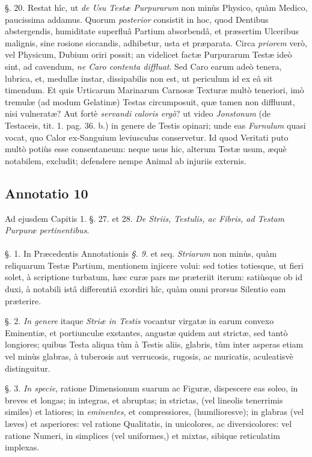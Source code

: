 \documentclass[a4paper, 11pt, oneside, polutonikogreek, german]{article}
\begin{document}
§. 20. Restat hîc, ut \emph{de Usu Testæ Purpurarum} non minùs Physico, quàm Medico, paucissima addamus. Quorum \emph{posterior} consistit in hoc, quod Dentibus abstergendis, humiditate superfluâ Partium absorbendâ, et præsertim Ulceribus malignis, sine rosione siccandis, adhibetur, usta et præparata. Circa \emph{priorem} verò, vel Physicum, Dubium oriri possit; an videlicet factæ Purpurarum Testæ ideò sint, ad cavendum, \emph{ne Caro contenta diffluat}. Sed Caro earum adeò tenera, lubrica, et, medullæ instar, dissipabilis non est, ut periculum id ex eâ sit timendum. Et quis Urticarum Marinarum Carnosæ Texturæ multò teneriori, imò tremulæ (ad modum Gelatinæ) Testas circumposuit, quæ tamen non diffluunt, nisi vulneratæ? Aut fortè \emph{servandi caloris ergò}? ut video \emph{Jonstonum} (de Testaceis, tit. 1. pag. 36. b.) in genere de Testis opinari; unde eas \emph{Furnulum} quasi vocat, quo Calor ex-Sanguium leviusculus conservetur. Id quod Veritati puto multò potiùs esse consentaneum: neque usus hic, alterum Testæ usum, æquè notabilem, excludit; defendere nempe Animal ab injuriis externis.

\subsection{Annotatio 10}
\begin{center}
Ad ejusdem Capitis 1. §. 27. et 28. \emph{De Striis, Testulis, ac Fibris, ad Testam Purpuræ pertinentibus}.
\end{center}
\paragraph{}
§. 1. In Præcedentis Annotationis \emph{§. 9.} et seq. \emph{Striarum} non minùs, quàm reliquarum Testæ Partium, mentionem injicere volui: sed toties totiesque, ut fieri solet, à scriptione turbatum, hæc curæ pars me præteriit iterum: satiùsque ob id duxi, à notabili istâ differentiâ exordiri hîc, quàm omni prorsus Silentio eam præterire.

§. 2. \emph{In genere} itaque \emph{Striæ in Testis} vocantur virgatæ in earum convexo Eminentiæ, et portiunculæ exstantes, angustæ quidem aut strictæ, sed tantò longiores; quibus Testa aliqua tùm à Testis aliis, glabris, tùm inter asperas etiam vel minùs glabras, à tuberosis aut verrucosis, rugosis, ac muricatis, aculeatisvè distinguitur.

§. 3. \emph{In specie}, ratione Dimensionum suarum ac Figuræ, dispescere eas soleo, in breves et longas; in integras, et abruptas; in strictas, (vel lineolis tenerrimis similes) et latiores; in \emph{eminentes}, et compressiores, (humilioresve); in glabras (vel læves) et asperiores: vel ratione Qualitatis, in unicolores, ac diversicolores: vel ratione Numeri, in simplices (vel uniformes,) et mixtas, sibique reticulatim implexas.
\end{document}
